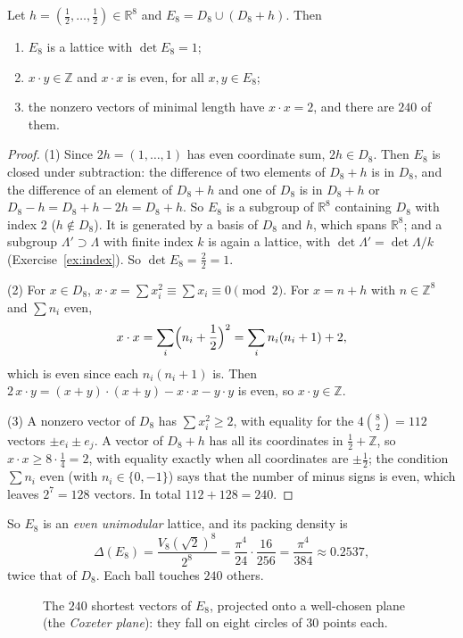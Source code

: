 \begin{theorem}\label{thm:e8}
Let $h=(\frac12,\dots,\frac12)\in\mathbb R^8$ and $E_8=D_8\cup(D_8+h)$. Then
\begin{enumerate}
\item $E_8$ is a lattice with $\det E_8=1$;
\item $x\cdot y\in\mathbb Z$ and $x\cdot x$ is even, for all $x,y\in E_8$;
\item the nonzero vectors of minimal length have $x\cdot x=2$, and there are $240$ of them.
\end{enumerate}
\end{theorem}

\begin{proof}
(1) Since $2h=(1,\dots,1)$ has even coordinate sum, $2h\in D_8$. Then $E_8$ is closed under subtraction: the difference of two elements of $D_8+h$ is in $D_8$,
and the difference of an element of $D_8+h$ and one of $D_8$ is in $D_8+h$ or $D_8-h=D_8+h-2h=D_8+h$. So $E_8$ is a subgroup of $\mathbb R^8$ containing
$D_8$ with index $2$ ($h\notin D_8$). It is generated by a basis of $D_8$ and $h$, which spans $\mathbb R^8$; and a subgroup $\Lambda'\supset\Lambda$ with
finite index $k$ is again a lattice, with $\det\Lambda'=\det\Lambda/k$ (Exercise~\ref{ex:index}). So $\det E_8=\frac22=1$.

(2) For $x\in D_8$, $x\cdot x=\sum x_i^2\equiv\sum x_i\equiv0\pmod2$. For $x=n+h$ with $n\in\mathbb Z^8$ and $\sum n_i$ even,
\[
x\cdot x=\sum_i\Bigl(n_i+\frac12\Bigr)^2=\sum_in_i(n_i+1)+2,
\]
which is even since each $n_i(n_i+1)$ is. Then $2\,x\cdot y=(x+y)\cdot(x+y)-x\cdot x-y\cdot y$ is even, so $x\cdot y\in\mathbb Z$.

(3) A nonzero vector of $D_8$ has $\sum x_i^2\ge2$, with equality for the $4\binom82=112$ vectors $\pm e_i\pm e_j$. A vector of $D_8+h$ has all its coordinates
in $\frac12+\mathbb Z$, so $x\cdot x\ge8\cdot\frac14=2$, with equality exactly when all coordinates are $\pm\frac12$; the condition $\sum n_i$ even (with
$n_i\in\{0,-1\}$) says that the number of minus signs is even, which leaves $2^7=128$ vectors. In total $112+128=240$.
\end{proof}

So $E_8$ is an \emph{even unimodular} lattice, and its packing density is
\[
\Delta(E_8)=\frac{V_8(\sqrt2)^8}{2^8}=\frac{\pi^4}{24}\cdot\frac{16}{256}=\frac{\pi^4}{384}\approx0.2537,
\]
twice that of $D_8$. Each ball touches $240$ others.

\begin{figure}[ht]
\centering
{}
\caption{The $240$ shortest vectors of $E_8$, projected onto a well-chosen plane (the \emph{Coxeter plane}): they fall on eight circles of $30$ points each.}
\label{fig:e8}
\end{figure}

